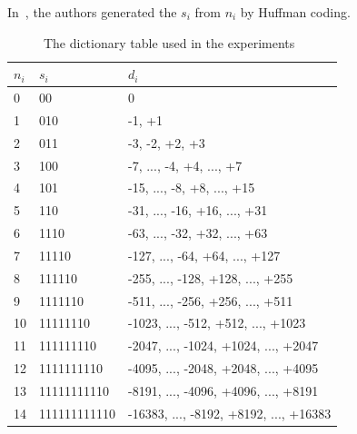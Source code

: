 In~\cite{marcelloni2008simple}, the authors generated the $s_i$ from
$n_i$ by Huffman coding.   
\begin{table}[]
\begin{tabular}{|l|l|l|}
\hline
$n_i$ & $s_i$        & $d_i$                                  \\ \hline
0     & 00           & 0                                      \\ 
1     & 010          & -1, +1                                 \\
2     & 011          & -3, -2, +2, +3                         \\
3     & 100          & -7, ..., -4, +4, ..., +7               \\
4     & 101          & -15, ..., -8, +8, ..., +15             \\
5     & 110          & -31, ..., -16, +16, ..., +31           \\
6     & 1110         & -63, ..., -32, +32, ..., +63           \\
7     & 11110        & -127, ..., -64, +64, ..., +127         \\
8     & 111110       & -255, ..., -128, +128, ..., +255       \\
9     & 1111110      & -511, ..., -256, +256, ..., +511       \\
10    & 11111110     & -1023, ..., -512, +512, ..., +1023     \\
11    & 111111110    & -2047, ..., -1024, +1024, ..., +2047   \\
12    & 1111111110   & -4095, ..., -2048, +2048, ..., +4095   \\
13    & 11111111110  & -8191, ..., -4096, +4096, ..., +8191   \\
14    & 111111111110 & -16383, ..., -8192, +8192, ..., +16383 \\
\hline
\end{tabular}
\caption{The dictionary table used in the experiments~\cite{marcelloni2009efficient}}
\label{table:LEC}
\end{table}
 
